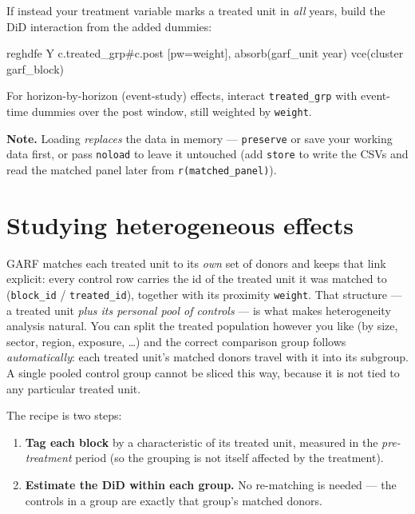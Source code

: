 \documentclass[11pt,a4paper]{article}
\newcommand{\code}[1]{\texttt{#1}}
\begin{document}
If instead your treatment variable marks a treated unit in \emph{all} years, build the DiD
interaction from the added dummies:
\begin{stata}
reghdfe Y c.treated_grp#c.post [pw=weight], absorb(garf_unit year) vce(cluster garf_block)
\end{stata}
For horizon-by-horizon (event-study) effects, interact \code{treated\_grp} with event-time
dummies over the post window, still weighted by \code{weight}.

\medskip
\noindent\textbf{Note.} Loading \emph{replaces} the data in memory --- \code{preserve} or save
your working data first, or pass \code{noload} to leave it untouched (add \code{store} to write
the CSVs and read the matched panel later from \code{r(matched\_panel)}).

\section{Studying heterogeneous effects}

GARF matches each treated unit to its \emph{own} set of donors and keeps that link explicit:
every control row carries the id of the treated unit it was matched to
(\code{block\_id} / \code{treated\_id}), together with its proximity \code{weight}. That
structure --- a treated unit \emph{plus its personal pool of controls} --- is what makes
heterogeneity analysis natural. You can split the treated population however you like (by size,
sector, region, exposure, \dots) and the correct comparison group follows \emph{automatically}:
each treated unit's matched donors travel with it into its subgroup. A single pooled control
group cannot be sliced this way, because it is not tied to any particular treated unit.

The recipe is two steps:
\begin{enumerate}[leftmargin=1.6em,itemsep=1pt,topsep=2pt]
\item \textbf{Tag each block} by a characteristic of its treated unit, measured in the
      \emph{pre-treatment} period (so the grouping is not itself affected by the treatment).
\item \textbf{Estimate the DiD within each group.} No re-matching is needed --- the controls in a
      group are exactly that group's matched donors.
\end{enumerate}
\end{document}
